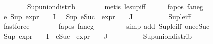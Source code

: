 \begin{isabellebody}
\ \ \ \ \ \ \isamarkupfalse%
\ Sup{\isacharunderscore}{\kern0pt}union{\isacharunderscore}{\kern0pt}distrib\isanewline
\ \ \ \ \ \ \isamarkupfalse%
\ {\isacharparenleft}{\kern0pt}metis\ le{\isacharunderscore}{\kern0pt}sup{\isacharunderscore}{\kern0pt}iff{\isacharparenright}{\kern0pt}\isanewline
\ \ \ \ \isamarkupfalse%
\ fa{\isacharunderscore}{\kern0pt}pos\ fa{\isacharunderscore}{\kern0pt}neg\ \isamarkupfalse%
\ e{}{\isacharcolon}{\kern0pt}\ {\isachardoublequoteopen}Sup\ {\isacharparenleft}{\kern0pt}{\isacharparenleft}{\kern0pt}expr{\isacharunderscore}{\kern0pt}{}\ {\isasymcirc}\ {\isasymPhi}{\isacharparenright}{\kern0pt}\ {\isacharbackquote}{\kern0pt}\ I{\isacharparenright}{\kern0pt}\ {\isasymle}\ {}{\isachardoublequoteclose}\ {\isachardoublequoteopen}Sup\ {\isacharparenleft}{\kern0pt}{\isacharparenleft}{\kern0pt}eSuc\ {\isasymcirc}\ expr{\isacharunderscore}{\kern0pt}{}\ {\isasymcirc}\ {\isasymPhi}{\isacharparenright}{\kern0pt}\ {\isacharbackquote}{\kern0pt}\ J{\isacharparenright}{\kern0pt}\ {\isasymle}\ {}{\isachardoublequoteclose}\isanewline
\ \ \ \ \ \ \isamarkupfalse%
\ Sup{\isacharunderscore}{\kern0pt}le{\isacharunderscore}{\kern0pt}iff\ \isanewline
\ \ \ \ \ \ \ \isamarkupfalse%
\ fastforce\isanewline
\ \ \ \ \ \ \isamarkupfalse%
\ fa{\isacharunderscore}{\kern0pt}pos\ fa{\isacharunderscore}{\kern0pt}neg\ \isanewline
\ \ \ \ \ \ \isamarkupfalse%
\ {\isacharparenleft}{\kern0pt}simp\ add{\isacharcolon}{\kern0pt}\ Sup{\isacharunderscore}{\kern0pt}le{\isacharunderscore}{\kern0pt}iff\ one{\isacharunderscore}{\kern0pt}eSuc{\isacharparenright}{\kern0pt}\isanewline
\ \ \ \ \isamarkupfalse%
\ {\isachardoublequoteopen}{\isacharparenleft}{\kern0pt}Sup\ {\isacharparenleft}{\kern0pt}{\isacharparenleft}{\kern0pt}expr{\isacharunderscore}{\kern0pt}{}\ {\isasymcirc}\ {\isasymPhi}{\isacharparenright}{\kern0pt}\ {\isacharbackquote}{\kern0pt}\ I\ {\isasymunion}\ {\isacharparenleft}{\kern0pt}{\isacharparenleft}{\kern0pt}eSuc\ {\isasymcirc}\ expr{\isacharunderscore}{\kern0pt}{}\ {\isasymcirc}\ {\isasymPhi}{\isacharparenright}{\kern0pt}\ {\isacharbackquote}{\kern0pt}\ J{\isacharparenright}{\kern0pt}{\isacharparenright}{\kern0pt}{\isacharparenright}{\kern0pt}\ {\isasymle}\ {}{\isachardoublequoteclose}\isanewline
\ \ \ \ \ \ \isamarkupfalse%
\ Sup{\isacharunderscore}{\kern0pt}union{\isacharunderscore}{\kern0pt}distrib\isanewline

\end{isabellebody}
